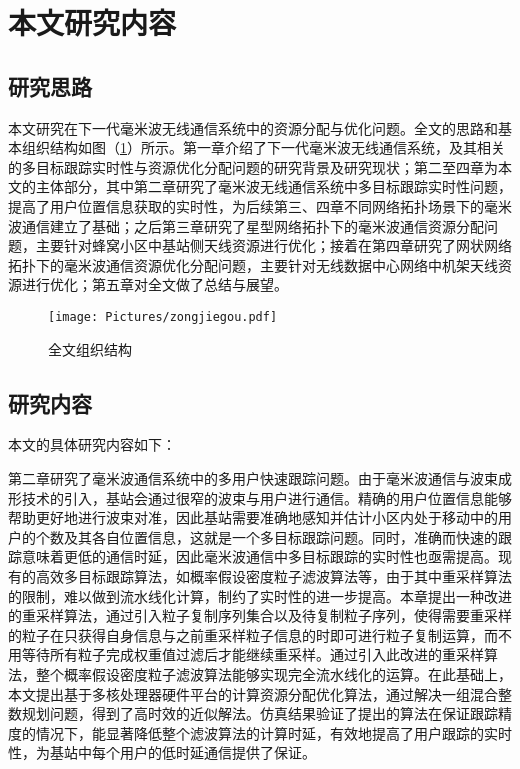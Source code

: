 \section{本文研究内容}

\subsection{研究思路}

本文研究在下一代毫米波无线通信系统中的资源分配与优化问题。全文的思路和基本组织结构如图（\ref{fig:the}）所示。第一章介绍了下一代毫米波无线通信系统，及其相关的多目标跟踪实时性与资源优化分配问题的研究背景及研究现状；第二至四章为本文的主体部分，其中第二章研究了毫米波无线通信系统中多目标跟踪实时性问题，提高了用户位置信息获取的实时性，为后续第三、四章不同网络拓扑场景下的毫米波通信建立了基础；之后第三章研究了星型网络拓扑下的毫米波通信资源分配问题，主要针对蜂窝小区中基站侧天线资源进行优化；接着在第四章研究了网状网络拓扑下的毫米波通信资源优化分配问题，主要针对无线数据中心网络中机架天线资源进行优化；第五章对全文做了总结与展望。

\begin{figure}[t]
\centering
\texttt{[image: Pictures/zongjiegou.pdf]}
\caption{全文组织结构}
\label{fig:the}
\end{figure}

\subsection{研究内容}

本文的具体研究内容如下：

第二章研究了毫米波通信系统中的多用户快速跟踪问题。由于毫米波通信与波束成形技术的引入，基站会通过很窄的波束与用户进行通信。精确的用户位置信息能够帮助更好地进行波束对准，因此基站需要准确地感知并估计小区内处于移动中的用户的个数及其各自位置信息，这就是一个多目标跟踪问题。同时，准确而快速的跟踪意味着更低的通信时延，因此毫米波通信中多目标跟踪的实时性也亟需提高。现有的高效多目标跟踪算法，如概率假设密度粒子滤波算法等，由于其中重采样算法的限制，难以做到流水线化计算，制约了实时性的进一步提高。本章提出一种改进的重采样算法，通过引入粒子复制序列集合以及待复制粒子序列，使得需要重采样的粒子在只获得自身信息与之前重采样粒子信息的时即可进行粒子复制运算，而不用等待所有粒子完成权重值过滤后才能继续重采样。通过引入此改进的重采样算法，整个概率假设密度粒子滤波算法能够实现完全流水线化的运算。在此基础上，本文提出基于多核处理器硬件平台的计算资源分配优化算法，通过解决一组混合整数规划问题，得到了高时效的近似解法。仿真结果验证了提出的算法在保证跟踪精度的情况下，能显著降低整个滤波算法的计算时延，有效地提高了用户跟踪的实时性，为基站中每个用户的低时延通信提供了保证。

